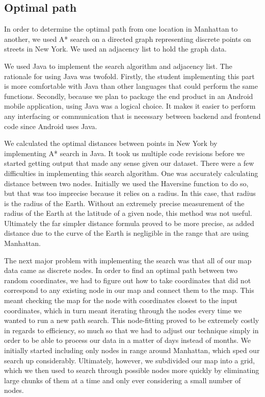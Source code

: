 \documentclass{sig-alternate}
\begin{document}
\subsection{Optimal path}
In order to determine the optimal path from one location in Manhattan to another, we used A* search on a directed graph representing discrete points on streets in New York.  We used an adjacency list to hold the graph data.  
 
We used Java to implement the search algorithm and adjacency list.  The rationale for using Java was twofold.  Firstly, the student implementing this part is more comfortable with Java than other languages that could perform the same functions.  Secondly, because we plan to package the end product in an Android mobile application, using Java was a logical choice.  It makes it easier to perform any interfacing or communication that is necessary between backend and frontend code since Android uses Java.
 
        	We calculated the optimal distances between points in New York by implementing A* search in Java.  It took us multiple code revisions before we started getting output that made any sense given our dataset.  There were a few difficulties in implementing this search algorithm.  One was accurately calculating distance between two nodes.  Initially we used the Haversine function to do so, but that was too imprecise because it relies on a radius.  In this case, that radius is the radius of the Earth.  Without an extremely precise measurement of the radius of the Earth at the latitude of a given node, this method was not useful.  Ultimately the far simpler distance formula proved to be more precise, as added distance due to the curve of the Earth is negligible in the range that are using \– Manhattan.

        	 The next major problem with implementing the search was that all of our map data came as discrete nodes.  In order to find an optimal path between two random coordinates, we had to figure out how to take coordinates that did not correspond to any existing node in our map and connect them to the map.  This meant checking the map for the node with coordinates closest to the input coordinates, which in turn meant iterating through the nodes every time we wanted to run a new path search.  This node-fitting proved to be extremely costly in regards to efficiency, so much so that we had to adjust our technique simply in order to be able to process our data in a matter of days instead of months.  We initially started including only nodes in range around Manhattan, which sped our search up considerably.  Ultimately, however, we subdivided our map into a grid, which we then used to search through possible nodes more quickly by eliminating large chunks of them at a time and only ever considering a small number of nodes.
\end{document}

